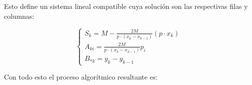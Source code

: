 \begin{aportacionOriginal}
Esto define un sistema lineal compatible
cuya solución son las respectivas filas y columnas: 

\begin{equation}
    \left\{ 
        \begin{array}{l}
            S_{k} =
                M -  \frac{2 M}{p \cdot (x_k - x_{k-1})}(p \cdot x_{k})
            \\
            A_{k i} = \frac{2 M}{p \cdot (x_k - x_{k-1})}
            p_{i} 
            \\
            B_{* k} = y_k - y_{k-1}
        \end{array}
    \right.
\end{equation}  
\end{aportacionOriginal} %

Con todo esto el proceso algorítmico resultante es: 

